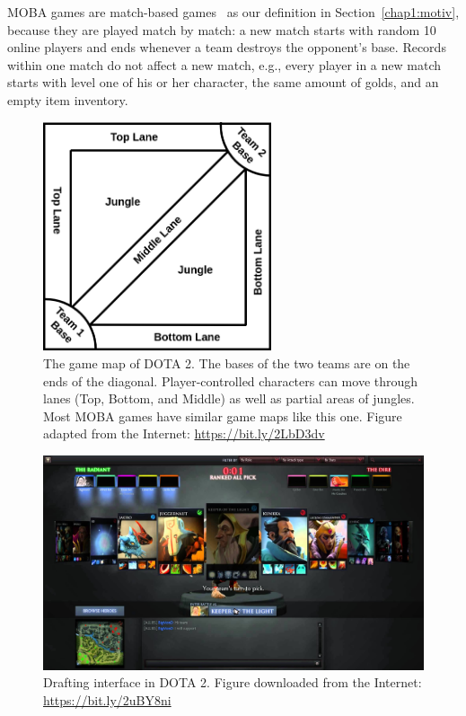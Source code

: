 MOBA games are match-based games~\citep{guo2012analysis} as our definition in Section~\ref{chap1:motiv}, because they are played match by match: a new match starts with random 10 online players and ends whenever a team destroys the opponent's base. Records  within one match do not affect a new match, e.g., every player in a new match starts with level one of his or her character, the same amount of golds, and an empty item inventory.


\begin{figure}
\centering
\includegraphics[width=0.6\textwidth]{Figures/dota_map.png}
\caption{The game map of DOTA 2. The bases of the two teams are on the ends of the diagonal. Player-controlled characters can move through lanes (Top, Bottom, and Middle) as well as partial areas of jungles. Most MOBA games have similar game maps like this one. Figure adapted from the Internet: \url{https://bit.ly/2LbD3dv}}
\label{fig:moba_map}
\end{figure}

\begin{figure}
\centering
\includegraphics[width=1\textwidth]{Figures/ranked_all_pick.jpg}
\caption{Drafting interface in DOTA 2. Figure downloaded from the Internet: \url{https://bit.ly/2uBY8ni}}
\label{fig:ranked_all_pick_interface}
\end{figure}

